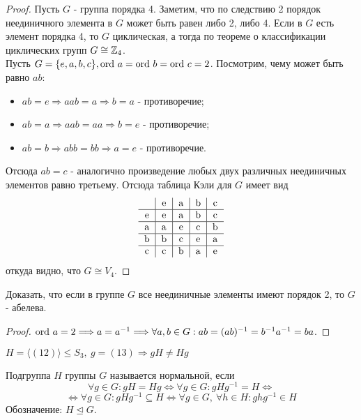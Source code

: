 \begin{proof}
    Пусть $G$ - группа порядка 4. Заметим, что по следствию 2 порядок неединичного элемента в $G$ может быть равен либо 2, либо 4. Если в $G$ есть элемент порядка 4, то $G$ циклическая, а тогда по теореме о классификации циклических групп $G \cong \mathbb{Z}_4$.\\
    Пусть $G = \{e, a, b, c\}, \textup{ord } a = \textup{ord } b = \textup{ord } c = 2$. Посмотрим, чему может быть равно $ab$:
    \begin{itemize}
        \item $ab = e \Longrightarrow aab = a \Longrightarrow b = a$ - противоречие;
        \item $ab = a \Longrightarrow aab = aa \Longrightarrow b = e$ - противоречие;
        \item $ab = b \Longrightarrow abb = bb \Longrightarrow a = e$ - противоречие.
    \end{itemize}
    Отсюда $ab = c$ - аналогично произведение любых двух различных неединичных элементов равно третьему. Отсюда таблица Кэли для $G$ имеет вид
    $$\begin{tabular}{c|c|c|c|c}
        \null & e & a & b & c \\ \hline
        e & e & a & b & c \\ \hline
        a & a & e & c & b \\ \hline
        b & b & c & e & a \\ \hline
        c & c & b & a & e
        \end{tabular}$$
    откуда видно, что $G \cong V_4$.
\end{proof}
\begin{exercise}
    Доказать, что если в группе $G$ все неединичные элементы имеют порядок 2, то $G$ - абелева.
\end{exercise}
\begin{proof}
    $\textup{ord } a = 2 \Longrightarrow a = a^{-1} \Longrightarrow \forall a, b \in G: ab = (ab)^{-1} = b^{-1}a^{-1} = ba$.
\end{proof}
\begin{example}
    $H = \langle (12) \rangle \leq S_3,\ g=(13) \Rightarrow gH \neq Hg$
\end{example}
\begin{definition}
    Подгруппа $H$ группы $G$ называется нормальной, если 
    \[\forall g\in G: gH=Hg \Longleftrightarrow \forall g\in G: gHg^{-1}=H \Longleftrightarrow\]
    \[\Longleftrightarrow \forall g\in G: gHg^{-1}\subseteq H \Longleftrightarrow \forall g\in G,\ \forall h\in H: ghg^{-1}\in H\]
    Обозначение: $H\unlhd G$. 
\end{definition} 
